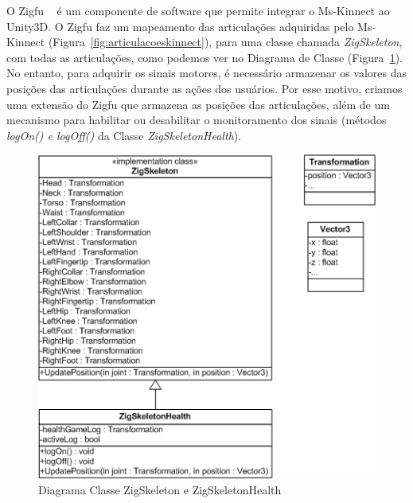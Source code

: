 
O Zigfu ~\cite{zigfu} é um componente de software que permite integrar o Ms-Kinnect ao Unity3D. O Zigfu faz um mapeamento das articulações adquiridas pelo Ms-Kinnect (Figura~\ref{fig:articulacoeskinnect}), para uma classe chamada \textit{ZigSkeleton}, com todas as articulações, como podemos ver no Diagrama de Classe (Figura~\ref{fig:diagramaclassezigfu}). No entanto, para adquirir os sinais motores, é necessário armazenar os valores das posições das articulações durante as ações dos usuários. Por esse motivo, criamos uma extensão do Zigfu que armazena as posições das articulações, além de um mecanismo para habilitar ou desabilitar o monitoramento dos sinais (métodos \textit{logOn() e logOff()} da Classe \textit{ZigSkeletonHealth}).

\begin{figure}[!htbp]
 \centering
 \includegraphics[scale=0.8]{./img/diagclasszigfu.png}
 \caption{Diagrama Classe ZigSkeleton e ZigSkeletonHealth}
 \label{fig:diagramaclassezigfu}
\end{figure}
%

